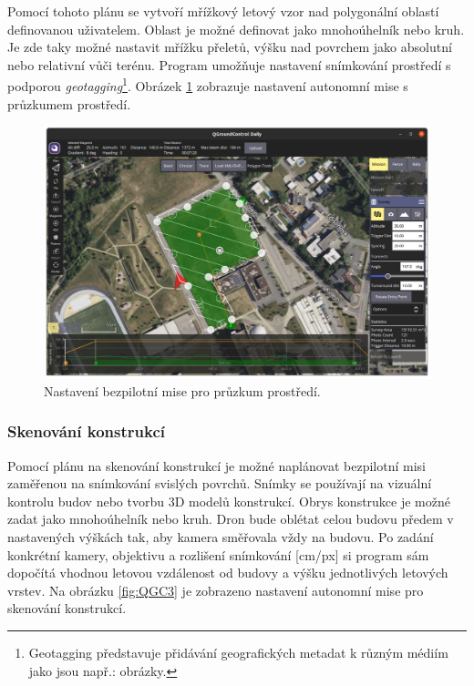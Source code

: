 Pomocí tohoto plánu se vytvoří mřížkový letový vzor nad polygonální oblastí definovanou uživatelem. Oblast je možné definovat jako mnohoúhelník nebo kruh. Je zde taky možné nastavit mřížku přeletů, výšku nad povrchem jako absolutní nebo relativní vůči terénu. Program umožňuje nastavení snímkování prostředí s podporou \textit{geotagging}\footnote{Geotagging představuje přidávání geografických metadat k různým médiím jako jsou např.: obrázky.}. Obrázek \ref{fig:QGC2} zobrazuje nastavení autonomní mise s průzkumem prostředí.

\begin{figure}[!ht]
    \begin{center}
        \includegraphics[scale=0.34]{obrazky/QGC3}
    \end{center}
    \caption[Nastavení bezpilotní mise pro průzkum prostředí]{Nastavení bezpilotní mise pro průzkum prostředí.}
    \label{fig:QGC2}
\end{figure}

\subsubsection{Skenování konstrukcí}

Pomocí plánu na skenování konstrukcí je možné naplánovat bezpilotní misi zaměřenou na snímkování svislých povrchů. Snímky se používají na vizuální kontrolu budov nebo tvorbu 3D modelů konstrukcí. Obrys konstrukce je možné zadat jako mnohoúhelník nebo kruh. Dron bude oblétat celou budovu předem v nastavených výškách tak, aby kamera směřovala vždy na budovu. Po zadání konkrétní kamery, objektivu a rozlišení snímkování [cm/px] si program sám dopočítá vhodnou letovou vzdálenost od budovy a výšku jednotlivých letových vrstev. Na obrázku \ref{fig:QGC3} je zobrazeno nastavení autonomní mise pro skenování konstrukcí.

